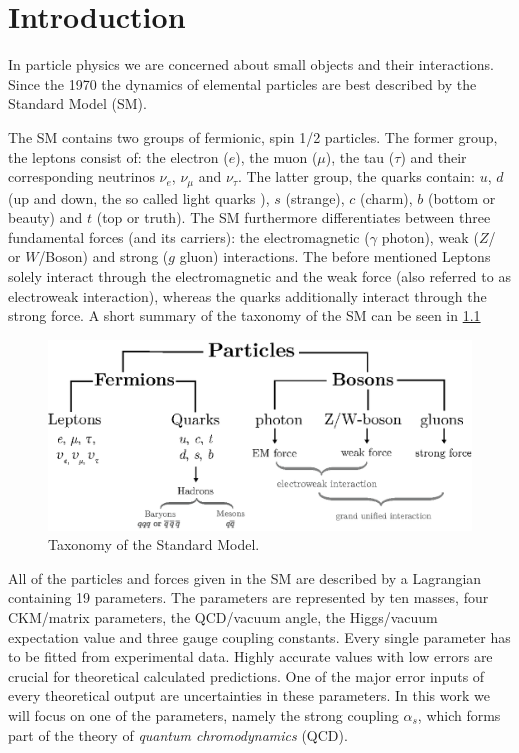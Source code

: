 \documentclass[../../index.tex]{subfiles}
\begin{document}
\chapter{Introduction}
In particle physics we are concerned about small objects and their interactions.
Since the 1970 the dynamics of elemental particles are best described by the Standard Model (SM).

The SM contains two groups of fermionic, spin 1/2 particles. The former group,
the leptons consist of: the electron ($e$), the muon ($\mu$), the tau ($\tau$)
and their corresponding neutrinos $\nu_e$, $\nu_\mu$ and $\nu_\tau$. The latter
group, the quarks contain: $u$, $d$ (up and down, the so called light quarks ),
$s$ (strange), $c$ (charm), $b$ (bottom or beauty) and $t$ (top or truth). The SM
furthermore differentiates between three fundamental forces (and its carriers):
the electromagnetic ($\gamma$ photon), weak ($Z$\-/ or $W$\-/Boson) and strong ($g$
gluon) interactions. The before mentioned Leptons solely interact through the
electromagnetic and the weak force (also referred to as electroweak interaction),
whereas the quarks additionally interact through the strong force. A short
summary of the taxonomy of the SM can be seen in \cref{fig:SMTaxonomy}
\begin{figure}
  \centering
  \includegraphics[width=\textwidth]{./images/standardModelTaxonomy.eps}
  \caption{Taxonomy of the Standard Model.}
  \label{fig:SMTaxonomy}
\end{figure}

All of the particles and forces given in the SM are described by a Lagrangian
containing 19 parameters. The parameters are represented by ten masses, four CKM\-/matrix parameters, the QCD\-/vacuum
angle, the Higgs\-/vacuum expectation value and three gauge coupling constants.
Every single parameter has to be fitted from experimental data. Highly accurate
values with low errors are crucial for theoretical calculated predictions. One
of the major error inputs of every theoretical output are uncertainties in these
parameters. In this work we will focus on one of the parameters, namely the
strong coupling $\alpha_s$, which forms part of the theory of
\textit{quantum chromodynamics} (QCD).
\end{document}
